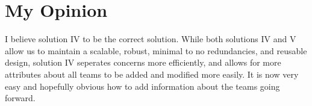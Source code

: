 \documentclass{article}
\begin{document}
\section{My Opinion}  I believe solution IV to be the correct solution. While both solutions IV and V allow us to maintain a scalable, robust, minimal to no redundancies, and reusable design, solution IV seperates concerns more efficiently, and allows for more attributes about all teams to be added and modified more easily. It is now very easy and hopefully obvious how to add information about the teams going forward.





  
\end{document}

